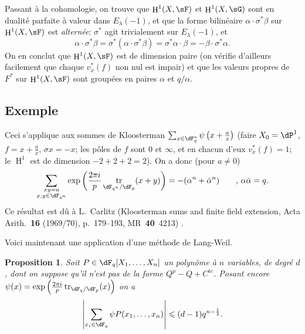 \documentclass[oneside]{book}
\DeclareMathOperator{\h}{H}
\DeclareMathOperator{\tr}{tr}
\theoremstyle{sga-source}
\theoremstyle{sga-source-dash}
\theoremstyle{sga-source-dotdash}
\theoremstyle{sga-source-number-note-dash}
\theoremstyle{sga-source-note-number-dotdash}
\theoremstyle{sga-source-example-dotdash}
\theoremstyle{sga-source-inline-number}
\theoremstyle{sga-source-bare-number}
\theoremstyle{sga-source}
\newtheorem{proposition_}[subsection]{Proposition}
\newcommand{\PrintPage}[1]{}\newcommand{\MathPage}[1]{}\newcommand{\PrintCite}[2]{#1}\newcommand{\var}[3]{#2}
\begin{document}
Passant à la cohomologie, on trouve que $\h^1(X,\sF)$ et $\h^1(X,\sG)$ sont en 
\var{dualité parfaite à valeur dans $E_\lambda(1)$}{dualité parfaite à valeur dans $E_\lambda(-1)$}{S45-SOL-0780}, et que la forme bilinéaire 
$\alpha\cdot \sigma^\ast\beta$ sur $\h^1(X,\sF)$ est \emph{alternée}: 
\var{$\sigma^\ast$ agit trivialement sur $E_\lambda(1)$}{$\sigma^\ast$ agit trivialement sur $E_\lambda(-1)$}{S45-SOL-0781}, et 
\[
  \alpha\cdot \sigma^\ast \beta = \sigma^\ast(\alpha\cdot \sigma^\ast \beta) = \sigma^\ast \alpha\cdot \beta = -\beta\cdot \sigma^\ast \alpha \text{.} 
\]
On en conclut que $\h^1(X,\sF)$ est de dimension paire (on vérifie d'ailleurs 
facilement que chaque $v_x^\ast(f)$ non nul est impair) et que les valeurs 
propres de $F^\ast$ sur $\h^1(X,\sF)$ sont groupées en paires $\alpha$ et 
$q/\alpha$. 





\PrintPage{193}
\subsection{Exemple}\label{VI:3-7}

Ceci s'applique aux sommes de Kloosterman 
$\sum_{x\in \dF_q^\ast} \psi\left(x+\frac a x\right)$ (faire 
$X_0=\dP^1$, $f=x+\frac a x$, $\sigma x=-x$; les pôles de $f$ sont $0$ et 
$\infty$, et en chacun d'eux $v_x^\ast(f)=1$; le $\h^1$ est de dimension 
$-2+2+2=2$). On a donc (pour $a\ne 0$) 
\[
  \sum_{\substack{x y=a \\ x,y\in \dF_{q^n}}} \exp\left(\frac{2\pi i}{p} \tr_{\dF_{q^n}/\dF_p}(x+y)\right) = -(\alpha^n+\bar\alpha^n) \qquad \text{, }\alpha\bar \alpha = q \text{.} 
\]
Ce résultat est dû à L.\ Carlitz (Kloosterman sums and finite field extension, Acta Arith.~\textbf{16} (1969/70), p.~179--193, MR~\textbf{40}~4213) \cite{ca69}. 

Voici maintenant une application d'une méthode de Lang-Weil. 





\begin{proposition_}\label{VI:3-8}
Soit $P\in \dF_q[X_1,\dots,X_n]$ un polynôme \var{à $n$ variable}{à $n$ variables}{S45-SOL-0784}, de degré 
$d$, dont on suppose qu'il n'est pas de la forme $Q^p-Q+C^{te}$. Posant encore 
$\psi(x) = \exp\left(\frac{2\pi i}{p} \tr_{\dF_q/\dF_p}(x)\right)$ on a 
\[
  \left|\sum_{x_i\in \dF_q} \psi P(x_1,\dots,x_n)\right| \leqslant (d-1) q^{n-\frac 1 2} \text{.}
\]
\end{proposition_}
\end{document}
